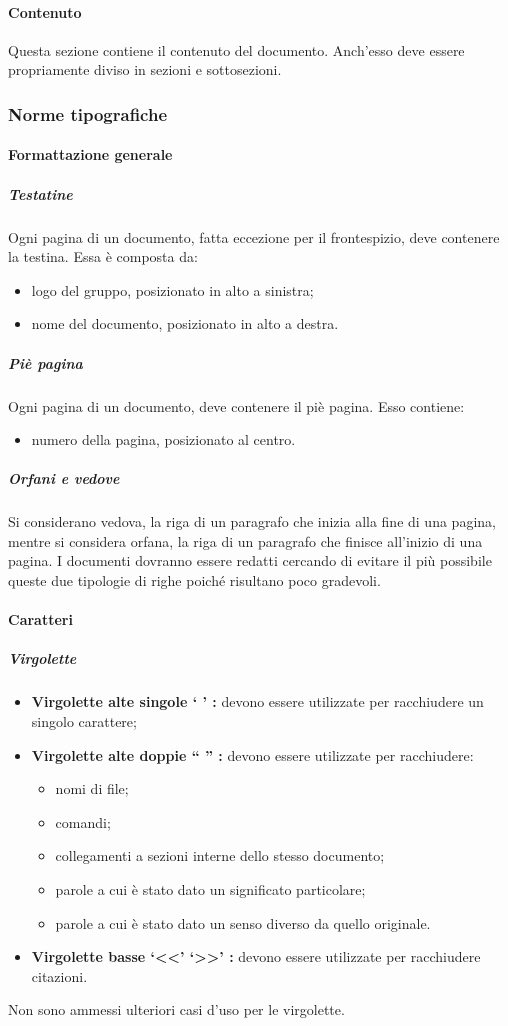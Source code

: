 \documentclass[../NormeProgetto.tex]{subfiles}
\begin{document}
		\paragraph{Contenuto}
			Questa sezione contiene il contenuto del documento. Anch'esso deve essere propriamente diviso in sezioni e sottosezioni.
	
	\subsubsection{Norme tipografiche} \label{sec:Norme tipografiche}
		\paragraph{Formattazione generale}
			\subparagraph{Testatine}
				Ogni pagina di un documento, fatta eccezione per il frontespizio, deve contenere la testina. Essa è composta da:
				\begin{itemize}
					\item logo del gruppo, posizionato in alto a sinistra;
					\item nome del documento, posizionato in alto a destra.
				\end{itemize}
			\subparagraph{Piè pagina}
				Ogni pagina di un documento, deve contenere il piè pagina. Esso contiene:
				\begin{itemize}
					\item numero della pagina, posizionato al centro.
				\end{itemize}
			\subparagraph{Orfani e vedove}
				Si considerano vedova, la riga di un paragrafo che inizia alla fine di una pagina, mentre si considera orfana, la riga di un paragrafo che finisce all'inizio di una pagina. I documenti dovranno essere redatti cercando di evitare il più possibile queste due tipologie di righe poiché risultano poco gradevoli. 
		\paragraph{Caratteri}
			
			\subparagraph{Virgolette}
				\begin{itemize}
					\item \textbf{Virgolette alte singole ` ' :} devono essere utilizzate per racchiudere un singolo carattere;
					\item \textbf{Virgolette alte doppie `` '' :} devono essere utilizzate per racchiudere:
					\begin{itemize}
						\item nomi di file;
						\item comandi;
						\item collegamenti a sezioni interne dello stesso documento;
						\item parole a cui è stato dato un significato particolare;
						\item parole a cui è stato dato un senso diverso da quello originale.
					\end{itemize}
					\item \textbf{Virgolette basse `<<' `>>' :} devono essere utilizzate per racchiudere citazioni.
				\end{itemize}
				Non sono ammessi ulteriori casi d'uso per le virgolette.
			
\end{document}

